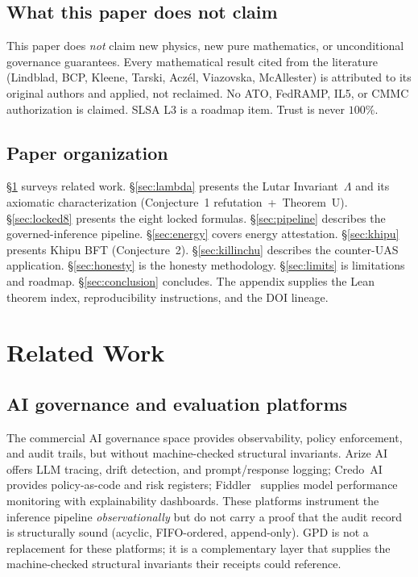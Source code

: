 \documentclass[11pt,letterpaper]{article}
\theoremstyle{definition}
\newcommand{\Lam}{\Lambda}
\begin{document}
\subsection{What this paper does not claim}

This paper does \emph{not} claim new physics, new pure mathematics, or
unconditional governance guarantees.  Every mathematical result cited from the
literature (Lindblad, BCP, Kleene, Tarski, Acz\'el, Viazovska, McAllester) is
attributed to its original authors and applied, not reclaimed.  No ATO,
FedRAMP, IL5, or CMMC authorization is claimed.  SLSA L3 is a roadmap item.
Trust is never $100\%$.

\subsection{Paper organization}

\S\ref{sec:related} surveys related work.  \S\ref{sec:lambda} presents the
Lutar Invariant~$\Lam$ and its axiomatic characterization (Conjecture~1
refutation~+~Theorem~U).  \S\ref{sec:locked8} presents the eight locked
formulas.  \S\ref{sec:pipeline} describes the governed-inference pipeline.
\S\ref{sec:energy} covers energy attestation.  \S\ref{sec:khipu} presents
Khipu BFT (Conjecture~2).  \S\ref{sec:killinchu} describes the counter-UAS
application.  \S\ref{sec:honesty} is the honesty methodology.
\S\ref{sec:limits} is limitations and roadmap.  \S\ref{sec:conclusion}
concludes.  The appendix supplies the Lean theorem index, reproducibility
instructions, and the DOI lineage.

\section{Related Work}
\label{sec:related}

\subsection{AI governance and evaluation platforms}

The commercial AI governance space provides observability, policy enforcement,
and audit trails, but without machine-checked structural invariants.  Arize
AI~\cite{arize2024} offers LLM tracing, drift detection, and prompt/response
logging; Credo~AI~\cite{credoai2024} provides policy-as-code and risk registers;
Fiddler~\cite{fiddler2024} supplies model performance monitoring with explainability
dashboards.  These platforms instrument the inference pipeline \emph{observationally}
but do not carry a proof that the audit record is structurally sound (acyclic,
FIFO-ordered, append-only).  GPD is not a replacement for these platforms; it is
a complementary layer that supplies the machine-checked structural invariants their
receipts could reference.
\end{document}
